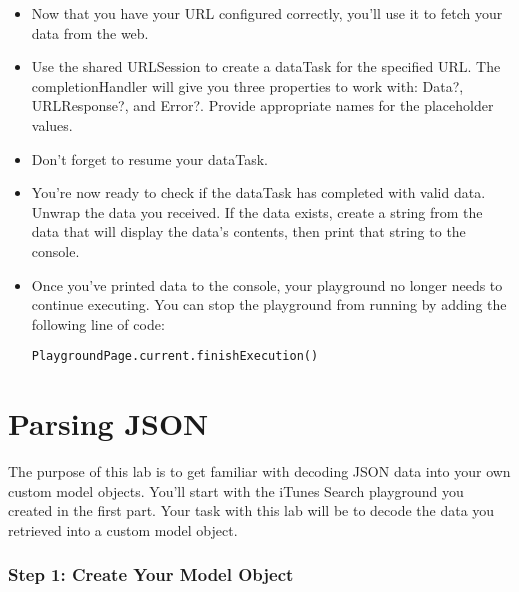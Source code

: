 \documentclass[a4paper,11pt]{scrartcl}
\begin{document}
\begin{itemize}
\item Now that you have your URL configured correctly, you'll use it to fetch your data from the web. 
\item Use the shared URLSession to create a dataTask for the specified URL. The completionHandler will give you three properties to work with: Data?, URLResponse?, and Error?. Provide appropriate names for the placeholder values.
\item Don't forget to resume your dataTask.
\item You're now ready to check if the dataTask has completed with valid data. Unwrap the data you received. If the data exists, create a string from the data that will display the data's contents, then print that string to the console. 
\item Once you've printed data to the console, your playground no longer needs to continue executing. You can stop the playground from running by adding the following line of code:
\begin{lstlisting}
PlaygroundPage.current.finishExecution()
\end{lstlisting}
\end{itemize}

\part{Parsing JSON}

The purpose of this lab is to get familiar with decoding JSON data into your own custom model objects. You'll start with the iTunes Search playground you created in the first part. Your task with this lab will be to decode the data you retrieved into a custom model object.

\section*{Step 1: Create Your Model Object}
\end{document}
